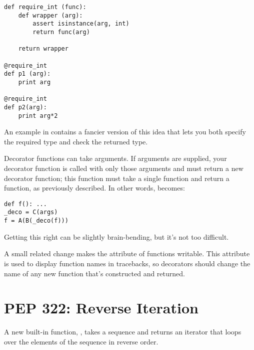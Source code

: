 \documentclass{howto}
\begin{document}
\begin{verbatim}
def require_int (func):
    def wrapper (arg):
        assert isinstance(arg, int)
        return func(arg)

    return wrapper

@require_int
def p1 (arg):
    print arg

@require_int
def p2(arg):
    print arg*2
\end{verbatim}

An example in  contains a fancier version of this idea that
lets you both specify the required type and check the returned type.

Decorator functions can take arguments.  If arguments are supplied,
your decorator function is called with only those arguments and must
return a new decorator function; this function must take a single
function and return a function, as previously described.  In other
words,  becomes:

\begin{verbatim}
def f(): ...
_deco = C(args)
f = A(B(_deco(f)))
\end{verbatim}

Getting this right can be slightly brain-bending, but it's not too
difficult.

A small related change makes the  attribute of
functions writable.  This attribute is used to display function names
in tracebacks, so decorators should change the name of any new
function that's constructed and returned.

\begin{seealso}
\end{seealso}



\section{PEP 322: Reverse Iteration}

A new built-in function, , takes a sequence
and returns an iterator that loops over the elements of the sequence 
in reverse order.  
\end{document}
